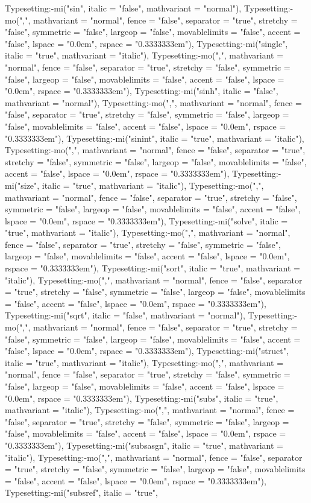 \documentclass{article}
\begin{document}
{{{\begin{maplegroup}
\begin{maplelatex}
Typesetting:-mi("sin", italic = "false", mathvariant = "normal"), Typesetting:-mo(",", mathvariant = "normal", fence = "false", separator = "true", stretchy = "false", symmetric = "false", largeop = "false", movablelimits = "false", accent = "false", lspace = "0.0em", rspace = "0.3333333em"), Typesetting:-mi("single", italic = "true", mathvariant = "italic"), Typesetting:-mo(",", mathvariant = "normal", fence = "false", separator = "true", stretchy = "false", symmetric = "false", largeop = "false", movablelimits = "false", accent = "false", lspace = "0.0em", rspace = "0.3333333em"), Typesetting:-mi("sinh", italic = "false", mathvariant = "normal"), Typesetting:-mo(",", mathvariant = "normal", fence = "false", separator = "true", stretchy = "false", symmetric = "false", largeop = "false", movablelimits = "false", accent = "false", lspace = "0.0em", rspace = "0.3333333em"), Typesetting:-mi("sinint", italic = "true", mathvariant = "italic"), Typesetting:-mo(",", mathvariant = "normal", fence = "false", separator = "true", stretchy = "false", symmetric = "false", largeop = "false", movablelimits = "false", accent = "false", lspace = "0.0em", rspace = "0.3333333em"), Typesetting:-mi("size", italic = "true", mathvariant = "italic"), Typesetting:-mo(",", mathvariant = "normal", fence = "false", separator = "true", stretchy = "false", symmetric = "false", largeop = "false", movablelimits = "false", accent = "false", lspace = "0.0em", rspace = "0.3333333em"), Typesetting:-mi("solve", italic = "true", mathvariant = "italic"), Typesetting:-mo(",", mathvariant = "normal", fence = "false", separator = "true", stretchy = "false", symmetric = "false", largeop = "false", movablelimits = "false", accent = "false", lspace = "0.0em", rspace = "0.3333333em"), Typesetting:-mi("sort", italic = "true", mathvariant = "italic"), Typesetting:-mo(",", mathvariant = "normal", fence = "false", separator = "true", stretchy = "false", symmetric = "false", largeop = "false", movablelimits = "false", accent = "false", lspace = "0.0em", rspace = "0.3333333em"), Typesetting:-mi("sqrt", italic = "false", mathvariant = "normal"), Typesetting:-mo(",", mathvariant = "normal", fence = "false", separator = "true", stretchy = "false", symmetric = "false", largeop = "false", movablelimits = "false", accent = "false", lspace = "0.0em", rspace = "0.3333333em"), Typesetting:-mi("struct", italic = "true", mathvariant = "italic"), Typesetting:-mo(",", mathvariant = "normal", fence = "false", separator = "true", stretchy = "false", symmetric = "false", largeop = "false", movablelimits = "false", accent = "false", lspace = "0.0em", rspace = "0.3333333em"), Typesetting:-mi("subs", italic = "true", mathvariant = "italic"), Typesetting:-mo(",", mathvariant = "normal", fence = "false", separator = "true", stretchy = "false", symmetric = "false", largeop = "false", movablelimits = "false", accent = "false", lspace = "0.0em", rspace = "0.3333333em"), Typesetting:-mi("subsasgn", italic = "true", mathvariant = "italic"), Typesetting:-mo(",", mathvariant = "normal", fence = "false", separator = "true", stretchy = "false", symmetric = "false", largeop = "false", movablelimits = "false", accent = "false", lspace = "0.0em", rspace = "0.3333333em"), Typesetting:-mi("subsref", italic = "true", 
\end{maplelatex}
\end{maplegroup}}}}
\end{document}
